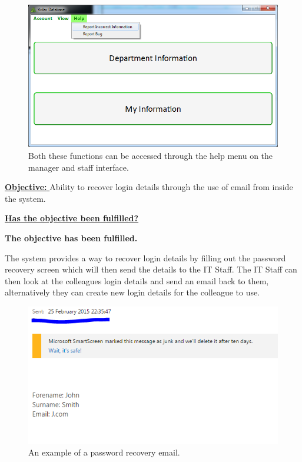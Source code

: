 \begin{figure}[H]
    \includegraphics[width=\textwidth]{./Testing/Images/HelpMenu.png}
    \caption{Both these functions can be accessed through the help menu on the manager and staff interface.} 
\end{figure}

\underline{\textbf{Objective:} } Ability to recover login details through the use of email from inside the system.

\underline{\textbf{Has the objective been fulfilled?}}

\textbf{The objective has been fulfilled.} 

The system provides a way to recover login details by filling out the password recovery screen which will then send the details to the IT Staff. The IT Staff can then look at the colleagues login details and send an email back to them, alternatively they can create new login details for the colleague to use.

\begin{figure}[H]
    \includegraphics[width=\textwidth]{./Testing/Images/ForgotPasswordValidationEmail.png}
    \caption{An example of a password recovery email.} 
\end{figure}

